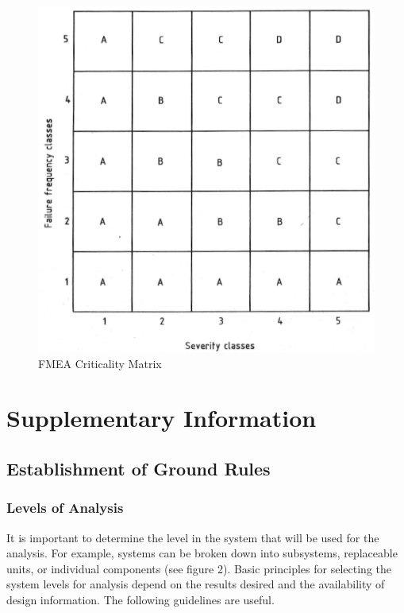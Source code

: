\documentclass[./dissertation.tex]{subfiles}
\begin{document}
\begin{figure}
	\includegraphics[width=\linewidth]{subfiles/imgs/fmea_criticality_matrix_with_bands.png}
  \caption{FMEA Criticality Matrix}
  \label{fig:criticality_matrix}
\end{figure}


\section{Supplementary Information}
\subsection{Establishment of Ground Rules}
\subsubsection{Levels of Analysis}

It is important to determine the level in the system that will be used for the analysis. For example, systems can be broken down into subsystems, replaceable units, or individual components (see figure 2). Basic principles for selecting the system levels for analysis depend on the results desired and the availability of design information. The following guidelines are useful.
\end{document}
